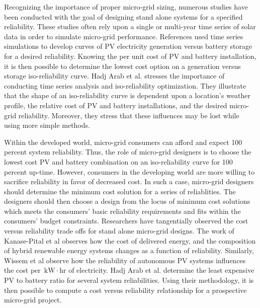 \documentclass[11p]{article}
\newcommand{\unit}[1]{\ensuremath{\, \mathrm{#1}}}
\begin{document}
Recognizing the importance of proper micro-grid sizing, numerous studies have been conducted with the goal of designing stand alone systems for a specified reliability. 
These studies often rely upon a single or multi-year time series of solar data in order to simulate micro-grid performance. 
References \cite{Markvart,Arun,Hadj} used time series simulations to develop curves of PV electricity generation versus battery storage for a desired reliability. 
Knowing the per unit cost of PV and battery installation, it is then possible to determine the lowest cost option on a generation versus storage iso-reliability curve. 
Hadj Arab et al. stresses the importance of conducting time series analysis and iso-reliability optimization. 
They illustrate that the shape of an iso-reliability curve is dependent upon a location's weather profile, the relative cost of PV and battery installations, and the desired micro-grid reliability. 
Moreover, they stress that these influences may be lost while using more simple methods. \cite{Hadj}   

Within the developed world, micro-grid consumers can afford and expect 100 percent system reliability.
Thus, the role of micro-grid designers is to choose the lowest cost PV and battery combination on an iso-reliability curve for 100 percent up-time.
However, consumers in the developing world are more willing to sacrifice reliability in favor of decreased cost.
In such a case, micro-grid designers should determine the minimum cost solution for a series of reliablities. 
The designers should then choose a design from the locus of minimum cost solutions which meets the consumers' basic reliability requirements and fits within the consumers' budget constraints. 
Researchers \cite{Hadj,Kanase,Wissem} have tangentially observed the cost versus reliability trade offs for stand alone micro-grid designs.  
The work of Kanase-Pital et al \cite{Kanase} observes how the cost of delivered energy, and the composition of hybrid renewable energy systems changes as a function of reliability.  
Similarly, Wissem et al \cite{Wissem} observe how the reliability of autonomous PV systems influences the cost per \unit{kW \! \cdot \! hr} of electricity. 
Hadj Arab et al. \cite{Hadj} determine the least expensive PV to battery ratio for several system reliabilities. 
Using their methodology, it is then possible to compute a cost versus reliability relationship for a prospective micro-grid project. 
\end{document}
